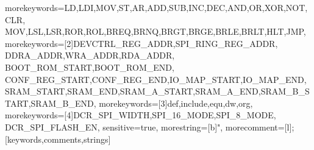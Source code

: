 %
 {morekeywords={LD,LDI,MOV,ST,AR,ADD,SUB,INC,DEC,AND,OR,XOR,NOT,CLR,%
	MOV,LSL,LSR,ROR,ROL,BREQ,BRNQ,BRGT,BRGE,BRLE,BRLT,HLT,JMP},%
morekeywords=[2]{DEVCTRL_REG_ADDR,SPI_RING_REG_ADDR,%
	DDRA_ADDR,WRA_ADDR,RDA_ADDR,%
	BOOT_ROM_START,BOOT_ROM_END,%
	CONF_REG_START,CONF_REG_END,IO_MAP_START,IO_MAP_END,%
	SRAM_START,SRAM_END,SRAM_A_START,SRAM_A_END,SRAM_B_START,SRAM_B_END},%
morekeywords=[3]{def,include,equ,dw,org},%
morekeywords=[4]{DCR_SPI_WIDTH,SPI_16_MODE,SPI_8_MODE,%
	DCR_SPI_FLASH_EN},%
   sensitive=true,%
   morestring=[b]",
   morecomment=[l];%
   }[keywords,comments,strings]

